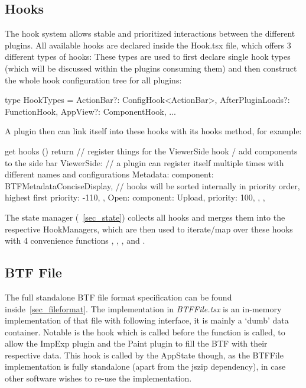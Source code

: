 \subsection{Hooks}\label{sec_hooks}
The hook system allows stable and prioritized interactions between the different
plugins. All available hooks are declared inside the {Hook.tsx} file, which
offers 3 different types of hooks:
These types are used to first declare single hook types (which will be discussed
within the plugins consuming them) and then construct the whole hook
configuration tree for all plugins:
\begin{typescript}
type HookTypes = {
  ActionBar?: ConfigHook<ActionBar>,
  AfterPluginLoads?: FunctionHook,
  AppView?: ComponentHook,
...
}
\end{typescript}
A plugin then can link itself into these hooks with its hooks method, for
example:
\begin{typescript}
get hooks () {
  return {
    // register things for the ViewerSide hook / add components to the side bar
    ViewerSide: {
      // a plugin can register itself multiple times with different names and configurations
      Metadata: {
        component: BTFMetadataConciseDisplay,
        // hooks will be sorted internally in priority order, highest first
        priority: -110,
      },
      Open: {
        component: Upload,
        priority: 100,
      },
    },
  }
}
\end{typescript}
The state manager (~\autoref{sec_state}) collects all hooks and merges them into
the respective HookManagers, which are then used to iterate/map over these hooks
with 4 convenience functions , ,
,  and .

\subsection{BTF File}\label{sec_btffile}
The full standalone BTF file format specification can be found inside~\autoref{sec_fileformat}.
The implementation in \emph{BTFFile.tsx} is an in-memory implementation of that
file with following interface, it is mainly a `dumb' data container.
Notable is the  hook which is called before the
 function is called, to allow the ImpExp plugin and the Paint
plugin to fill the BTF with their respective data. This hook is called by the
AppState though, as the BTFFile implementation is fully standalone (apart from
the jszip dependency), in case other software wishes to re-use the implementation.


